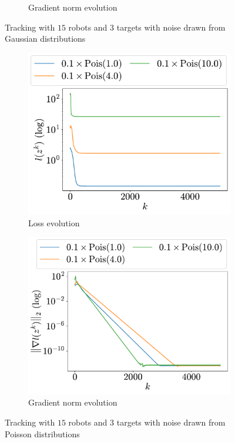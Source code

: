 \documentclass[a4paper,11pt,oneside]{book}
\begin{document}
\begin{figure}[H]
\begin{subfigure}[t]{0.46\linewidth}
            \caption{Gradient norm evolution}
      \end{subfigure}
      \caption{Tracking with $15$ robots and $3$ targets with noise drawn from Gaussian distributions}
      \label{fig:tracking_gaussian_15_3}
\end{figure}

\begin{figure}[H]
      \centering
      \begin{subfigure}[t]{0.46\linewidth}
            \centering
            \includegraphics[width=\linewidth]{./figs/tracking/poisson/loss.pdf} 
            \caption{Loss evolution}
      \end{subfigure}
      \hfill
      \begin{subfigure}[t]{0.46\linewidth}
            \centering
            \includegraphics[width=\linewidth]{./figs/tracking/poisson/gradient.pdf} 
            \caption{Gradient norm evolution}
      \end{subfigure}
      \caption{Tracking with $15$ robots and $3$ targets with noise drawn from Poisson distributions}
      \label{fig:tracking_poisson_15_3}
\end{figure}
\end{document}
